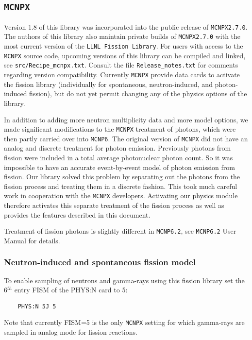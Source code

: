 \pagebreak
\subsection{{\tt MCNPX}}\label{sec:mcnpx}
Version 1.8 of this library was incorporated into the public release of {\tt MCNPX2.7.0}. The authors of this library also maintain private builds of {\tt MCNPX2.7.0} with the most current version of the {\tt LLNL Fission Library}. For users with access to the {\tt MCNPX} source code, upcoming versions of this library can be compiled and linked, see \texttt{src/Recipe\_mcnpx.txt}. Consult the file \texttt{Release\_notes.txt} for comments regarding version compatibility. Currently {\tt MCNPX} provide data cards to activate the fission library (individually for spontaneous, neutron-induced, and photon-induced fission), but do not yet permit changing any of the physics options of the library. 

In addition to adding more neutron multiplicity data and more model options, we made significant modifications to the {\tt MCNPX} treatment of photons, which were then partly carried over into {\tt MCNP6}. The original version of {\tt MCNPX} did not have an analog and discrete treatment for photon emission. Previously photons from fission were included in a total average photonuclear photon count. So it was impossible to have an accurate event-by-event model of photon emission from fission. Our library solved this problem by separating out the photons from the fission process and treating them in a discrete fashion. This took much careful work in cooperation with the {\tt MCNPX} developers. Activating our physics module therefore activates this separate treatment of the fission process as well as provides the features described in this document.

Treatment of fission photons is slightly different in {\tt MCNP6.2}, see {\tt MCNP6.2} User Manual for details.

\subsubsection*{Neutron-induced and spontaneous fission model}

To enable sampling of neutrons and gamma-rays using this fission library set the 6$^{th}$ entry FISM of the PHYS:N card to 5:
\begin{verbatim}
	PHYS:N 5J 5
\end{verbatim}
Note that currently FISM=5 is the only {\tt MCNPX} setting for which gamma-rays are sampled in analog mode for fission reactions. 

